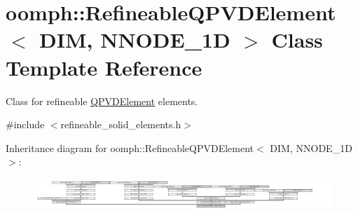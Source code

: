 \hypertarget{classoomph_1_1RefineableQPVDElement}{}\section{oomph\+:\+:Refineable\+Q\+P\+V\+D\+Element$<$ D\+IM, N\+N\+O\+D\+E\+\_\+1D $>$ Class Template Reference}
\label{classoomph_1_1RefineableQPVDElement}


Class for refineable \hyperlink{classoomph_1_1QPVDElement}{Q\+P\+V\+D\+Element} elements.  




{\ttfamily \#include $<$refineable\+\_\+solid\+\_\+elements.\+h$>$}

Inheritance diagram for oomph\+:\+:Refineable\+Q\+P\+V\+D\+Element$<$ D\+IM, N\+N\+O\+D\+E\+\_\+1D $>$\+:\begin{figure}[H]
\begin{center}
\leavevmode
\includegraphics[height=1.198777cm]{classoomph_1_1RefineableQPVDElement}
\end{center}
\end{figure}
